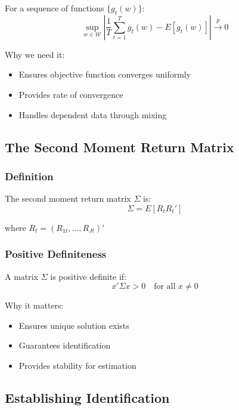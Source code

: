 \documentclass[12pt,article]{memoir}
\begin{document}
For a sequence of functions $\{g_t(w)\}$:
\begin{equation}
    \sup_{w \in \mathcal{W}} |\frac{1}{T}\sum_{t=1}^T g_t(w) - E[g_t(w)]| \xrightarrow{p} 0
\end{equation}

Why we need it:
\begin{itemize}
    \item Ensures objective function converges uniformly
    \item Provides rate of convergence
    \item Handles dependent data through mixing
\end{itemize}

\subsection{The Second Moment Return Matrix}

\subsubsection{Definition}

The second moment return matrix $\Sigma$ is:
\begin{equation}
    \Sigma = E[R_tR_t']
\end{equation}

where $R_t = (R_{1t}, ..., R_{Jt})'$

\subsubsection{Positive Definiteness}

A matrix $\Sigma$ is positive definite if:
\begin{equation}
    x'\Sigma x > 0 \quad \text{for all } x \neq 0
\end{equation}

Why it matters:
\begin{itemize}
    \item Ensures unique solution exists
    \item Guarantees identification
    \item Provides stability for estimation
\end{itemize}

\subsection{Establishing Identification}
\end{document}
